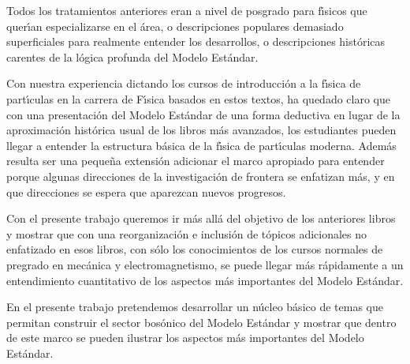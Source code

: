 Todos los tratamientos anteriores eran a nivel de posgrado  para f\'\i sicos que quer\'\i an especializarse en el \'area, o descripciones populares demasiado superficiales para realmente entender los desarrollos, o descripciones hist\'oricas carentes de la l\'ogica profunda del Modelo Est\'andar. 

Con nuestra experiencia dictando los cursos de introducci\'on a la f\'\i sica de part\'\i culas en la carrera de F\'\i sica basados en estos textos, ha quedado claro que con una presentaci\'on del Modelo Est\'andar de una forma deductiva en lugar de la aproximaci\'on hist\'orica usual de los libros m\'as avanzados, los estudiantes pueden llegar a entender la estructura b\'asica de la f\'\i sica de part\'\i culas moderna. Adem\'as resulta ser una peque\~na extensi\'on adicionar el marco apropiado para entender porque algunas direcciones de la investigaci\'on de frontera se enfatizan m\'as, y en que direcciones se espera que aparezcan nuevos progresos.

Con el presente trabajo queremos ir m\'as all\'a del objetivo de los anteriores libros y mostrar que con una reorganizaci\'on e inclusi\'on de t\'opicos adicionales no enfatizado en esos libros, con s\'olo los conocimientos de los cursos normales de pregrado en mec\'anica y electromagnetismo, se puede llegar m\'as r\'apidamente a un entendimiento cuantitativo de los aspectos m\'as importantes del Modelo Est\'andar.  

En el presente trabajo pretendemos desarrollar un n\'ucleo b\'asico de temas que permitan construir el sector bos\'onico del Modelo Est\'andar y mostrar que dentro de este marco se pueden ilustrar los aspectos m\'as importantes del Modelo Est\'andar.

